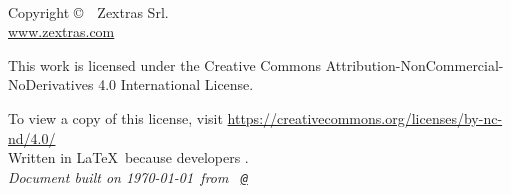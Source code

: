 
\newpage
~\vfill
\thispagestyle{empty}

Copyright \copyright\ \the\year\ Zextras Srl.\\ %

\url{www.zextras.com}\\ %

\ccbyncsa{}

This work is licensed under the Creative Commons Attribution-NonCommercial-NoDerivatives 4.0 International License.

To view a copy of this license, visit \url{https://creativecommons.org/licenses/by-nc-nd/4.0/}\\

Written in \LaTeX\ because developers \ExcuseToUseLatex.\\

\textit{Document built on \today\ from \texttt{\branchName\ \href{https://github.com/ZeXtras/ZimbraDrive/tree/\commitId}{@\shortCommitId}}} %
